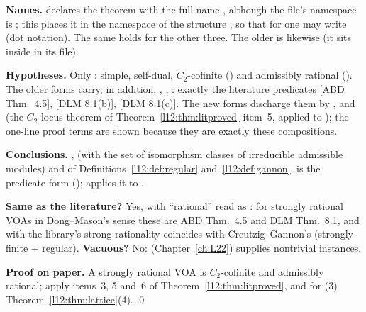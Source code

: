\begin{dictionary}
\textbf{Names.}  declares the theorem with the full name
, although the file's namespace is ; this
places it in the namespace of the structure , so that for  one may write
 (dot notation). The same holds for the other three. The older  is likewise
 (it sits inside  in its file).

\textbf{Hypotheses.} Only : simple, self-dual, $C_2$-cofinite () and
admissibly rational (). The older forms carry, in addition, , , : exactly the
literature predicates [ABD Thm.~4.5], [DLM 8.1(b)], [DLM 8.1(c)]. The new forms discharge them by
,  and
 (the $C_2$-locus theorem of Theorem~\ref{l12:thm:litproved}
item~5, applied to ); the one-line proof terms are shown because they are exactly these compositions.

\textbf{Conclusions.} ,  (with  the set of isomorphism classes of
irreducible admissible modules) and  of Definitions~\ref{l12:def:regular} and~\ref{l12:def:gannon}.
 is the predicate form ();
 applies it to .

\textbf{Same as the literature?} Yes, with ``rational'' read as : for strongly rational VOAs in
Dong--Mason's sense these are ABD Thm.~4.5 and DLM Thm.~8.1, and with  the library's strong rationality coincides with Creutzig--Gannon's
(strongly finite + regular). \textbf{Vacuous?} No:  (Chapter~\ref{ch:L22}) supplies nontrivial
instances.
\end{dictionary}

\textbf{Proof on paper.} A strongly rational VOA is $C_2$-cofinite and admissibly rational; apply items~3, 5 and~6 of
Theorem~\ref{l12:thm:litproved}, and for (3) Theorem~\ref{l12:thm:lattice}(4). \qed

